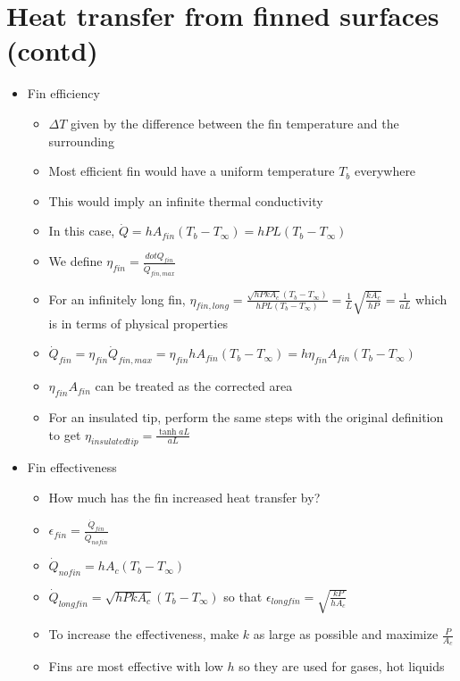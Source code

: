 \documentclass[12pt]{article}
\begin{document}
\section{Heat transfer from finned surfaces (contd)}
\begin{itemize}
    \item Fin efficiency \begin{itemize}
        \item $\Delta T$ given by the difference between the fin temperature and the surrounding
        \item Most efficient fin would have a uniform temperature $T_b$ everywhere
        \item This would imply an infinite thermal conductivity
        \item In this case, $\dot{Q} = h A_{fin} (T_b - T_{\infty}) = hPL(T_b - T_{\infty})$
        \item We define $\eta_{fin} = \frac{dot{Q}_{fin}}{\dot{Q}_{fin, max}}$
        \item For an infinitely long fin, $\eta_{fin, long} = \frac{\sqrt{hPkA_c}(T_b - T_{\infty})}{hPL(T_b - T_{\infty})} = \frac{1}{L} \sqrt{\frac{kA_c}{hP}} = \frac{1}{aL}$ which is in terms of physical properties
        \item $\dot{Q}_{fin} = \eta_{fin} \dot{Q}_{fin, max} = \eta_{fin} hA_{fin} (T_b - T_{\infty}) = h \eta_{fin} A_{fin} (T_b-T_{\infty})$
        \item $\eta_{fin} A_{fin}$ can be treated as the corrected area
        \item For an insulated tip, perform the same steps with the original definition to get $\eta_{insulated tip} = \frac{\tanh{aL}}{aL}$
    \end{itemize}
    \item Fin effectiveness \begin{itemize}
        \item How much has the fin increased heat transfer by?
        \item $\epsilon_{fin} = \frac{\dot{Q}_{fin}}{\dot{Q}_{no fin}}$
        \item $\dot{Q}_{no fin} = hA_c(T_b - T_{\infty})$
        \item $\dot{Q}_{long fin} = \sqrt{hPkA_c} (T_b - T_{\infty})$ so that $\epsilon_{long fin} =  \sqrt{\frac{kP}{hA_c}}$
        \item To increase the effectiveness, make $k$ as large as possible and maximize $\frac{P}{A_c}$
        \item Fins are most effective with low $h$ so they are used for gases, hot liquids

\end{itemize}
\end{itemize}
\end{document}
